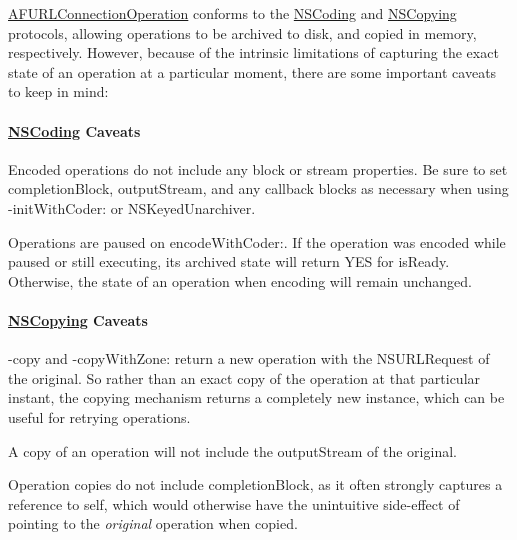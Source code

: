{\ttfamily \hyperlink{interface_a_f_u_r_l_connection_operation}{A\+F\+U\+R\+L\+Connection\+Operation}} conforms to the {\ttfamily \hyperlink{class_n_s_coding-p}{N\+S\+Coding}} and {\ttfamily \hyperlink{class_n_s_copying-p}{N\+S\+Copying}} protocols, allowing operations to be archived to disk, and copied in memory, respectively. However, because of the intrinsic limitations of capturing the exact state of an operation at a particular moment, there are some important caveats to keep in mind\+:

\paragraph*{\hyperlink{class_n_s_coding-p}{N\+S\+Coding} Caveats}


\begin{DoxyItemize}
\item Encoded operations do not include any block or stream properties. Be sure to set {\ttfamily completion\+Block}, {\ttfamily output\+Stream}, and any callback blocks as necessary when using {\ttfamily -\/init\+With\+Coder\+:} or {\ttfamily N\+S\+Keyed\+Unarchiver}.
\item Operations are paused on {\ttfamily encode\+With\+Coder\+:}. If the operation was encoded while paused or still executing, its archived state will return {\ttfamily Y\+E\+S} for {\ttfamily is\+Ready}. Otherwise, the state of an operation when encoding will remain unchanged.
\end{DoxyItemize}

\paragraph*{\hyperlink{class_n_s_copying-p}{N\+S\+Copying} Caveats}


\begin{DoxyItemize}
\item {\ttfamily -\/copy} and {\ttfamily -\/copy\+With\+Zone\+:} return a new operation with the {\ttfamily N\+S\+U\+R\+L\+Request} of the original. So rather than an exact copy of the operation at that particular instant, the copying mechanism returns a completely new instance, which can be useful for retrying operations.
\item A copy of an operation will not include the {\ttfamily output\+Stream} of the original.
\item Operation copies do not include {\ttfamily completion\+Block}, as it often strongly captures a reference to {\ttfamily self}, which would otherwise have the unintuitive side-\/effect of pointing to the {\itshape original} operation when copied. 
\end{DoxyItemize}

